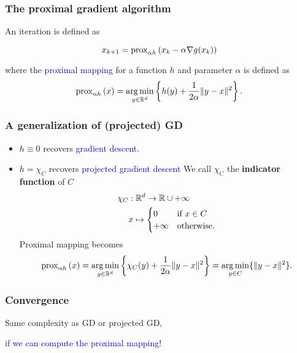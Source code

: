 \documentclass{beamer}
\begin{document}
\begin{frame}
  \frametitle{The proximal gradient algorithm}

  An iteration is defined as
  \begin{block}{}
  \begin{equation}
    x_{k+1} = \operatorname{prox}^{}_{\alpha h}\left(x_k - \alpha \nabla g(x_k) \right)
  \end{equation}
  \end{block}
  where the \textcolor{blue}{proximal mapping} for a function $h$ and parameter $\alpha$ is defined as
  \begin{equation}
    \operatorname{prox}^{}_{\alpha h}\left(x \right) = \operatorname*{arg\,min}_{y \in \mathbb{R}^d} \left\{ h(y) + \frac{1}{2 \alpha} \Vert y-x \Vert^2\right\}.
  \end{equation}


\end{frame}


\begin{frame}
  \frametitle{A generalization of (projected) GD}

  \begin{itemize}
    \item $h \equiv 0$ recovers \textcolor{blue}{gradient descent}.
    \item $h = \chi_C$ recovers \textcolor{blue}{projected gradient descent}
          We call $\chi_C$ the \textbf{indicator function} of $C$
          \begin{align}
            \chi_C&: \mathbb{R}^d \to \mathbb{R} \cup +\infty \\
              & x \mapsto \begin{cases}
                0 & \text{if $x \in C$} \\
                +\infty & \text{otherwise.}
              \end{cases}
          \end{align}
          Proximal mapping becomes
          \begin{equation}
            \operatorname{prox}^{}_{\alpha h}\left(x \right) = \operatorname*{arg\,min}_{y \in \mathbb{R}^d} \left\{ \chi_C(y) + \frac{1}{2 \alpha} \Vert y-x \Vert^2\right\} = \operatorname*{arg\,min}_{y \in C} \{ \Vert y-x \Vert^2\}.
          \end{equation}
  \end{itemize}
\end{frame}

\begin{frame}
  \frametitle{Convergence}

  Same complexity as GD or projected GD,

  \textcolor{blue}{if we can compute the proximal mapping!}

\end{frame}
\end{document}
